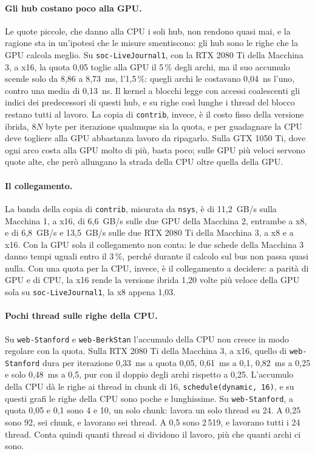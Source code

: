 \documentclass[11pt,a4paper]{article}
\begin{document}
\paragraph{Gli hub costano poco alla GPU.}
Le quote piccole, che danno alla CPU i soli hub, non rendono quasi mai,
e la ragione sta in un'ipotesi che le misure smentiscono: gli hub
sono le righe che la GPU calcola meglio. Su \texttt{soc-LiveJournal1}, con la
RTX 2080 Ti della Macchina 3, a x16, la quota 0,05 toglie alla GPU il 5\,\% degli archi,
ma il suo accumulo scende solo da 8,86 a
8,73~ms, l'1,5\,\%: quegli archi le costavano 0,04~ns l'uno, contro una media
di 0,13~ns. Il kernel a blocchi legge con accessi coalescenti gli indici dei
predecessori di questi hub, e su righe così
lunghe i thread del blocco restano tutti al lavoro. La copia di
\texttt{contrib}, invece, è il costo fisso della versione ibrida, $8N$ byte per
iterazione qualunque sia la quota,
e per guadagnare la CPU deve togliere alla GPU abbastanza lavoro
da ripagarlo. Sulla GTX 1050 Ti, dove ogni arco costa alla GPU molto di più,
basta poco; sulle GPU più veloci servono quote alte, che però allungano la
strada della CPU oltre quella della GPU.

\paragraph{Il collegamento.}
La banda della copia di \texttt{contrib}, misurata da \texttt{nsys}, è
di 11,2~GB/s sulla Macchina 1, a x16, di 6,6~GB/s sulle due GPU della
Macchina 2, entrambe a x8, e di 6,8~GB/s e 13,5~GB/s sulle due RTX 2080 Ti
della Macchina 3, a x8 e a x16. Con la GPU sola
il collegamento non conta: le due schede della Macchina 3 danno tempi uguali
entro il 3\,\%, perché durante il calcolo sul bus non passa quasi nulla. Con
una quota per la CPU, invece, è il collegamento a decidere: a parità di GPU e
di CPU, la x16 rende la versione ibrida 1,20 volte più veloce della GPU sola su
\texttt{soc-LiveJournal1}, la x8 appena 1,03.

\paragraph{Pochi thread sulle righe della CPU.}
Su \texttt{web-Stanford} e \texttt{web-BerkStan} l'accumulo della CPU
non cresce in modo regolare con la quota. Sulla RTX 2080 Ti della Macchina 3,
a x16, quello di \texttt{web-Stanford} dura per iterazione 0,33~ms a quota
0,05, 0,61~ms a 0,1, 0,82~ms a 0,25 e solo 0,48~ms a 0,5, pur con il doppio
degli archi rispetto a 0,25. L'accumulo della CPU dà le righe ai thread in
chunk di 16,
\texttt{schedule(dynamic,~16)}, e su questi grafi le righe della CPU sono poche
e lunghissime. Su \texttt{web-Stanford}, a quota 0,05 e 0,1 sono 4 e 10, un
solo chunk: lavora un solo thread su 24. A 0,25 sono 92, sei chunk, e
lavorano sei thread. A 0,5 sono 2\,519, e lavorano tutti i 24 thread. Conta
quindi quanti thread si dividono il lavoro, più che quanti archi ci sono.
\end{document}
